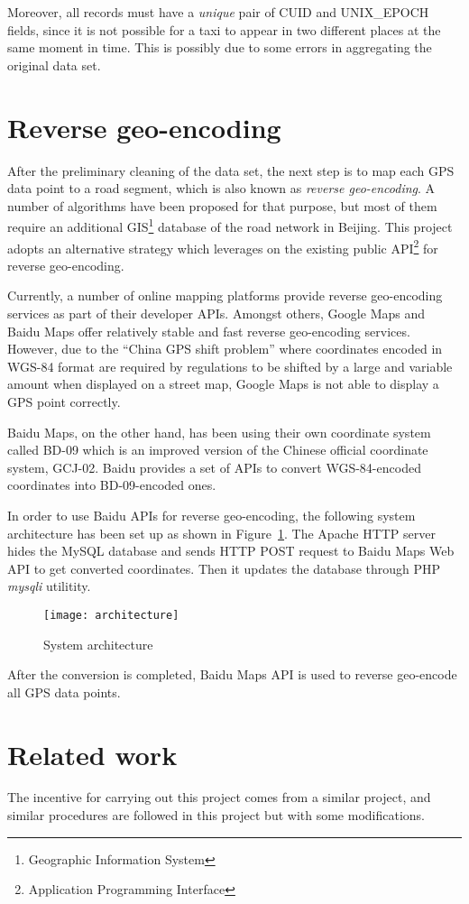 Moreover, all records must have a \emph{unique} pair of CUID and UNIX\_EPOCH fields, since it is not possible for a taxi to appear in two different places at the same moment in time. This is possibly due to some errors in aggregating the original data set.

\section{Reverse geo-encoding}
After the preliminary cleaning of the data set, the next step is to map each GPS data point to a road segment, which is also known as \emph{reverse geo-encoding}. A number of algorithms\cite{MAP09} have been proposed for that purpose, but most of them require an additional GIS\footnote{Geographic Information System} database of the road network in Beijing. This project adopts an alternative strategy which leverages on the existing public API\footnote{Application Programming Interface} for reverse geo-encoding. 

Currently, a number of online mapping platforms provide reverse geo-encoding services as part of their developer APIs. Amongst others, Google Maps and Baidu Maps offer relatively stable and fast reverse geo-encoding services. However, due to the ``China GPS shift problem''\cite{GSHF17} where coordinates encoded in WGS-84 format are required by regulations to be shifted by a large and variable amount when displayed on a street map, Google Maps is not able to display a GPS point correctly. 

Baidu Maps, on the other hand, has been using their own coordinate system called BD-09 which is an improved version of the Chinese official coordinate system, GCJ-02. Baidu provides a set of APIs to convert WGS-84-encoded coordinates into BD-09-encoded ones. 

In order to use Baidu APIs for reverse geo-encoding, the following system architecture has been set up as shown in Figure~\ref{Fig:archit}. The Apache HTTP server hides the MySQL database and sends HTTP POST request to Baidu Maps Web API to get converted coordinates. Then it updates the database through PHP \emph{mysqli} utilitity. 
\begin{figure}[h]
\texttt{[image: architecture]}
\centering
\caption{System architecture}\label{Fig:archit}
\end{figure}

After the conversion is completed, Baidu Maps API is used to reverse geo-encode all GPS data points.

\section{Related work}
The incentive for carrying out this project comes from a similar project\cite{TDR10}, and similar procedures are followed in this project but with some modifications. 


